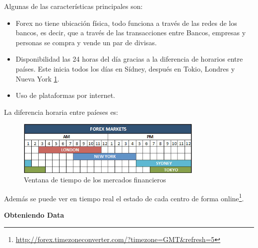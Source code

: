 Algunas de las características principales son:
\begin{itemize}
 \item Forex no tiene ubicación física, todo funciona a través de las redes de
 los bancos, es decir, que a través de las transacciones entre Bancos, empresas
 y personas se compra y vende un par de divisas.
 \item Disponibilidad las 24 horas del día gracias a la diferencia de horarios
 entre países. Este inicia todos los días en Sídney, después en Tokio, Londres
 y Nueva York \ref{fig:forex_markets_hours}.
 \item Uso de plataformas por internet.
\end{itemize}

La diferencia horaria entre paíeses es:
\begin{figure}[h!t]
    \begin{center}
        \includegraphics[width=0.8\textwidth]{images/ventana}
        \caption{Ventana de tiempo de los mercados financieros}
        \label{fig:forex_markets_hours}
    \end{center}
\end{figure}

\noindent Además se puede ver en tiempo real el estado de cada centro de forma
online\footnote{\url{http://forex.timezoneconverter.com/?timezone=GMT&refresh=5}}.

\vspace{1cm}
\noindent\textbf{Obteniendo Data}\\

